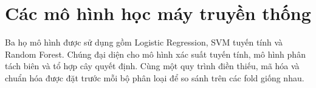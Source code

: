 \section{Các mô hình học máy truyền thống}
\label{sec:2_4}
Ba họ mô hình được sử dụng gồm Logistic Regression, SVM tuyến tính và Random Forest. Chúng đại diện cho mô hình xác suất tuyến tính, mô hình phân tách biên và tổ hợp cây quyết định. Cùng một quy trình điền thiếu, mã hóa và chuẩn hóa được đặt trước mỗi bộ phân loại để so sánh trên các fold giống nhau.



